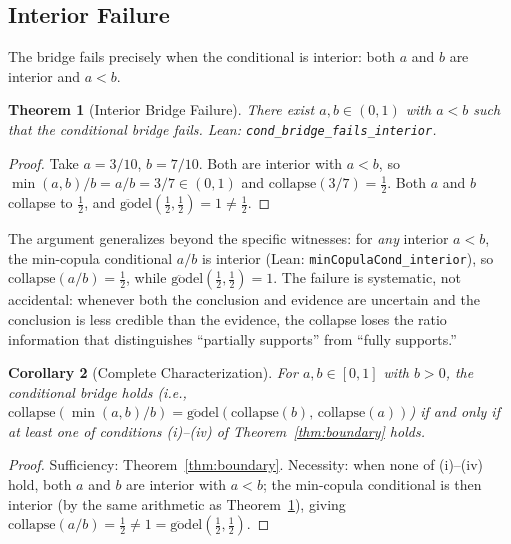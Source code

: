 \documentclass[11pt,a4paper]{article}
\newtheorem{theorem}{Theorem}[section]
\newtheorem{corollary}[theorem]{Corollary}
\begin{document}
\subsection{Interior Failure}
\label{sec:interior-fail}

The bridge fails precisely when the conditional is interior:
both $a$ and $b$ are interior and $a < b$.

\begin{theorem}[Interior Bridge Failure]
\label{thm:interior-fail}
There exist $a, b \in (0,1)$ with $a < b$ such that the conditional
bridge fails.
Lean: \texttt{cond\_bridge\allowbreak\_fails\_interior}.
\end{theorem}

\begin{proof}
Take $a = 3/10$, $b = 7/10$.
Both are interior with $a < b$, so
$\min(a,b)/b = a/b = 3/7 \in (0,1)$ and
$\mathrm{collapse}(3/7) = \tfrac{1}{2}$.
Both $a$ and $b$ collapse to $\tfrac{1}{2}$, and
$\mathrm{g\ddot{o}del}(\tfrac{1}{2}, \tfrac{1}{2})
= 1 \neq \tfrac{1}{2}$.
\end{proof}

The argument generalizes beyond the specific witnesses: for
\emph{any} interior $a < b$, the min-copula conditional $a/b$ is
interior (Lean: \texttt{minCopulaCond\allowbreak\_interior}),
so $\mathrm{collapse}(a/b) = \tfrac{1}{2}$, while
$\mathrm{g\ddot{o}del}(\tfrac{1}{2}, \tfrac{1}{2}) = 1$.
The failure is systematic, not accidental: whenever both the
conclusion and evidence are uncertain and the conclusion is less
credible than the evidence, the collapse loses the ratio
information that distinguishes ``partially supports'' from
``fully supports.''

\begin{corollary}[Complete Characterization]
\label{cor:complete-boundary}
For $a, b \in [0,1]$ with $b > 0$, the conditional bridge holds
(i.e., $\mathrm{collapse}(\min(a,b)/b) =
\mathrm{g\ddot{o}del}(\mathrm{collapse}(b),\,
\mathrm{collapse}(a))$)
if and only if at least one of conditions
\textup{(i)--(iv)} of Theorem~\ref{thm:boundary} holds.
\end{corollary}
\begin{proof}
Sufficiency: Theorem~\ref{thm:boundary}.
Necessity: when none of (i)--(iv) hold, both $a$ and $b$ are interior
with $a < b$; the min-copula conditional is then interior
(by the same arithmetic as Theorem~\ref{thm:interior-fail}),
giving $\mathrm{collapse}(a/b) = \tfrac{1}{2} \neq 1
= \mathrm{g\ddot{o}del}(\tfrac{1}{2}, \tfrac{1}{2})$.
\end{proof}
\end{document}
